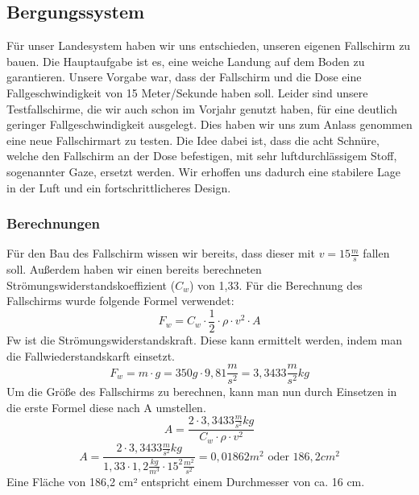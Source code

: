 \subsection{Bergungssystem}
Für unser Landesystem haben wir uns entschieden, unseren eigenen Fallschirm zu bauen. Die Hauptaufgabe ist es, eine weiche Landung auf dem Boden zu garantieren. Unsere Vorgabe war, dass der Fallschirm und die Dose eine Fallgeschwindigkeit von 15 Meter/Sekunde haben soll. Leider sind unsere Testfallschirme, die wir auch schon im Vorjahr genutzt haben, für eine deutlich geringer Fallgeschwindigkeit ausgelegt. Dies haben wir uns zum Anlass genommen eine neue Fallschirmart zu testen. Die Idee dabei ist, dass die acht Schnüre, welche den Fallschirm an der Dose befestigen, mit sehr luftdurchlässigem Stoff, sogenannter Gaze, ersetzt werden. Wir erhoffen uns dadurch eine stabilere Lage in der Luft und ein fortschrittlicheres Design.

\subsubsection{Berechnungen}
Für den Bau des Fallschirm wissen wir bereits, dass dieser mit \(v = 15\frac{m}{s}\) fallen soll. Außerdem haben wir einen bereits berechneten Strömungswiderstandskoeffizient (\(C_w\)) von 1,33. Für die Berechnung des Fallschirms wurde folgende Formel verwendet:
\[
F_w = C_w \cdot \frac{1}{2} \cdot \rho \cdot v^2 \cdot A
\]
Fw ist die Strömungswiderstandskraft. Diese kann ermittelt werden, indem man die Fallwiederstandskarft einsetzt.
\[
F_w = m \cdot g = 350g \cdot 9,81\frac{m}{s^2} = 3,3433\frac{m}{s^2}kg
\]
Um die Größe des Fallschirms zu berechnen, kann man nun durch Einsetzen in die erste Formel diese nach A umstellen.
\[
A=\frac{2 \cdot 3,3433\frac{m}{s^2}kg}{C_w \cdot \rho \cdot v^2}
\]
\[
A=\frac{2 \cdot 3,3433\frac{m}{s^2}kg}{1,33 \cdot 1,2\frac{kg}{m^3} \cdot 15^2\frac{m^2}{s^2}} = 0,01862m^2 \text{ oder } 186,2cm^2
\]
Eine Fläche von 186,2 cm² entspricht einem Durchmesser von ca. 16 cm.

